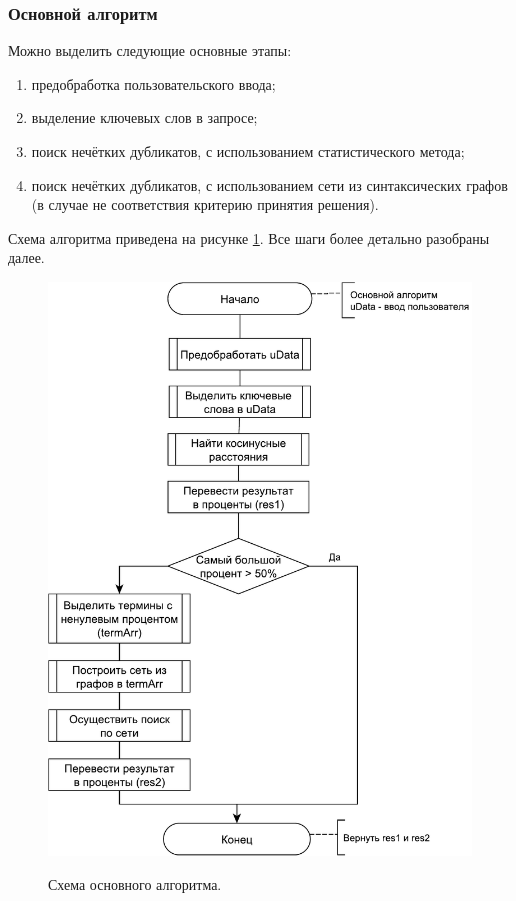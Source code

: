 \subsubsection{Основной алгоритм}
Можно выделить следующие основные этапы:
\begin{enumerate}
	\item предобработка пользовательского ввода;
	\item выделение ключевых слов в запросе;
	\item поиск нечётких дубликатов, с использованием статистического метода;
	\item поиск нечётких дубликатов, с использованием сети из синтаксических графов (в случае не соответствия критерию принятия решения).
\end{enumerate}

Схема алгоритма приведена на рисунке \ref{fig33:image}. Все шаги более детально разобраны далее.
\begin{figure}[h]
	\begin{center}
		{\includegraphics[scale = 0.6]{img/schemes/pdf/main.pdf}}
		\caption{Схема основного алгоритма.}
		\label{fig33:image}
	\end{center}
\end{figure}


